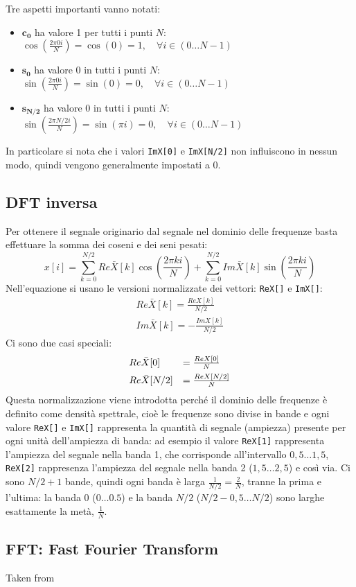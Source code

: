 Tre aspetti importanti vanno notati:
\begin{itemize}
	\item $\boldsymbol{c_0}$ ha valore 1 per tutti i punti $N$:
		$\cos\left(\frac{2\pi 0i}{N}\right) = \cos(0) = 1, \quad \forall i \in
		(0 \dots N-1)$
	\item $\boldsymbol{s_0}$ ha valore 0 in tutti i punti $N$:
		$\sin\left(\frac{2\pi 0i}{N}\right) = \sin(0) = 0, \quad \forall i \in
		(0 \dots N-1)$
	\item $\boldsymbol{s_{N/2}}$ ha valore 0 in tutti i punti $N$:
		$\sin\left(\frac{2\pi N/2i}{N}\right) = \sin(\pi i) = 0, \quad \forall i \in
		(0 \dots N-1)$
\end{itemize}

In particolare si nota che i valori \texttt{ImX[0]} e \texttt{ImX[N/2]} non
influiscono in nessun modo, quindi vengono generalmente impostati a 0. 

\subsection{DFT inversa}
Per ottenere il segnale originario dal segnale nel dominio delle frequenze basta
effettuare la somma dei coseni e dei seni pesati:
\[
x[i] = \sum_{k=0}^{N/2} Re\bar{X}[k] \cos\left(\frac{2\pi ki}{N}\right) +
\sum_{k=0}^{N/2} Im\bar{X}[k] \sin\left(\frac{2\pi ki}{N}\right)
\]
Nell'equazione si usano le versioni normalizzate dei vettori:
\texttt{ReX[]} e \texttt{ImX[]}:
\[
\begin{array}{l}
	Re\bar{X}[k] = \frac{ReX[k]}{N/2}\\[0.5em]
	Im\bar{X}[k] = -\frac{ImX[k]}{N/2}
\end{array}
\]
Ci sono due casi speciali:
\[
\begin{array}{l l}
	Re\bar{X}[0] & = \frac{ReX[0]}{N} \\[0.5em]
	Re\bar{X}[N/2] & = \frac{ReX[N/2]}{N}
\end{array}
\]
Questa normalizzazione viene introdotta perch\'e il dominio delle frequenze \`e
definito come densit\`a spettrale, cio\`e le frequenze sono divise in bande e
ogni valore \texttt{ReX[]} e \texttt{ImX[]} rappresenta la quantit\`a di segnale
(ampiezza) presente per ogni unit\`a dell'ampiezza di banda: ad esempio il
valore \texttt{ReX[1]} rappresenta l'ampiezza del segnale nella banda 1, che
corrisponde all'intervallo $0,5\dots1,5$, \texttt{ReX[2]} rappresenza l'ampiezza
del segnale nella banda 2 ($1,5\dots2,5$) e cos\`i via. Ci sono $N/2+1$ bande,
quindi ogni banda \`e larga $\frac{1}{N/2} = \frac{2}{N}$, tranne la prima e
l'ultima: la banda 0 ($0\dots 0.5$) e la banda $N/2$ ($N/2-0,5\dots N/2$) sono
larghe esattamente la met\`a, $\frac{1}{N}$.

\subsection{FFT: Fast Fourier Transform}
\label{fft}
Taken from \cite{bertoni}
